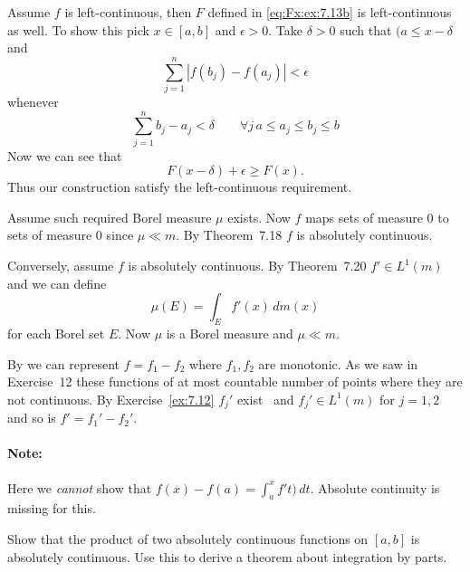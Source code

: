 \begin{enumerate}
\begin{itemize}
Assume $f$ is left-continuous, then $F$ defined in \eqref{eq:Fx:ex:7.13b}
is left-continuous as well. To show this pick \(x\in[a,b]\) and \(\epsilon>0\).
Take \(\delta>0\) such that \((a\leq x-\delta\) and 
\begin{equation*}
\sum_{j=1}^n |f(b_j) - f(a_j)| < \epsilon
\end{equation*}
whenever 
\begin{equation*}
\sum_{j=1}^n b_j - a_j < \delta \qquad  \forall j\, a\leq a_j\leq b_j\leq b
\end{equation*}
Now we can see that 
\begin{equation*}
F(x-\delta) + \epsilon \geq F(x).
\end{equation*}
Thus our construction satisfy the left-continuous requirement.

Assume such required Borel measure \(\mu\) exists.
Now $f$ maps sets of measure $0$ to sets of measure $0$ since 
\(\mu \ll m\). By Theorem~7.18 \cite{RudinRCA87} $f$ is absolutely continuous.

Conversely, assume $f$ is absolutely continuous.
By Theorem~7.20 \cite{RudinRCA87} \(f'\in L^1(m)\) and we can define
\begin{equation*}
\mu(E) = \int_E f'(x)\,dm(x)
\end{equation*}
for each Borel set $E$. Now \(\mu\) is a Borel measure and \(\mu \ll m\).

By  we can represent \(f=f_1-f_2\) where \(f_1,f_2\) are monotonic.
As we saw in Exercise~12 these functions of at most countable
number of points where they are not continuous.
By Exercise~\ref{ex:7.12}
\(f_j'\) exist \aded\ and \(f_j'\in L^1(m)\) for \(j=1,2\)
and so is \(f' = f_1' - f_2'\).

\paragraph{Note:} Here we \emph{cannot} show that 
\(f(x)-f(a) = \int_a^x f't)\,dt\). Absolute continuity is missing for this.
\end{itemize}

\begin{excopy}
Show that the product of two absolutely continuous functions on \([a,b]\)
is absolutely continuous. Use this to derive a theorem about integration
by parts.
\end{excopy}


\end{enumerate}
